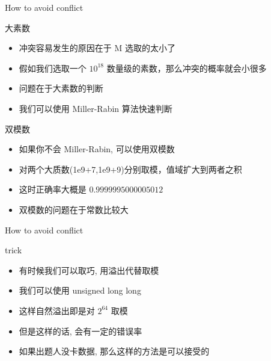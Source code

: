 \documentclass{ldr-simple-gray}
\begin{document}
  \begin{frame}{How to avoid conflict}
    \begin{block}{大素数}
      \begin{itemize}
        \item 冲突容易发生的原因在于 M 选取的太小了
        \item 假如我们选取一个 $10^{18}$ 数量级的素数，那么冲突的概率就会小很多
        \item 问题在于大素数的判断
        \item 我们可以使用 Miller-Rabin 算法快速判断
      \end{itemize}
    \end{block}
  
    \begin{block}{双模数}
      \begin{itemize}
        \item 如果你不会 Miller-Rabin, 可以使用双模数
        \item 对两个大质数(1e9+7,1e9+9)分别取模，值域扩大到两者之积
        \item 这时正确率大概是 $0.9999995000005012$
        \item 双模数的问题在于常数比较大
      \end{itemize}
    \end{block}
  \end{frame}
  
  \begin{frame}{How to avoid conflict}
    \begin{block}{trick}
      \begin{itemize}
        \item 有时候我们可以取巧, 用溢出代替取模
        \item 我们可以使用 unsigned long long
        \item 这样自然溢出即是对 $2^{64}$ 取模
        \item 但是这样的话, 会有一定的错误率
        \item 如果出题人没卡数据, 那么这样的方法是可以接受的
      \end{itemize}
    \end{block}
  \end{frame}
\end{document}
